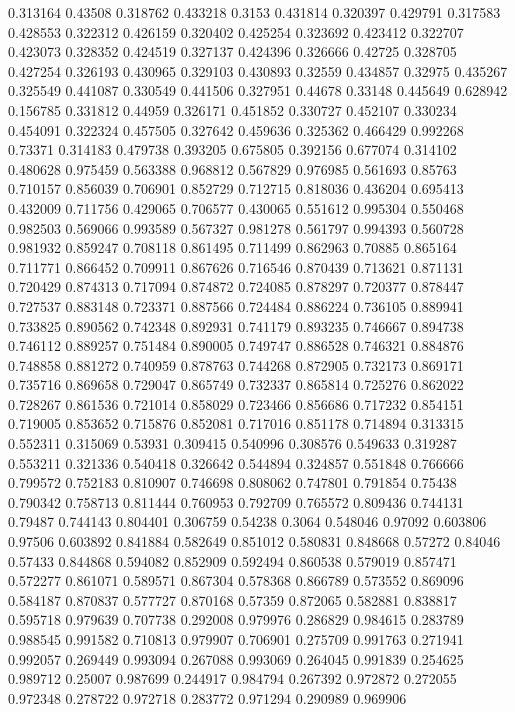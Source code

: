 0.313164 0.43508
0.318762 0.433218
0.3153 0.431814
0.320397 0.429791
0.317583 0.428553
0.322312 0.426159
0.320402 0.425254
0.323692 0.423412
0.322707 0.423073
0.328352 0.424519
0.327137 0.424396
0.326666 0.42725
0.328705 0.427254
0.326193 0.430965
0.329103 0.430893
0.32559 0.434857
0.32975 0.435267
0.325549 0.441087
0.330549 0.441506
0.327951 0.44678
0.33148 0.445649
0.628942 0.156785
0.331812 0.44959
0.326171 0.451852
0.330727 0.452107
0.330234 0.454091
0.322324 0.457505
0.327642 0.459636
0.325362 0.466429
0.992268 0.73371
0.314183 0.479738
0.393205 0.675805
0.392156 0.677074
0.314102 0.480628
0.975459 0.563388
0.968812 0.567829
0.976985 0.561693
0.85763 0.710157
0.856039 0.706901
0.852729 0.712715
0.818036 0.436204
0.695413 0.432009
0.711756 0.429065
0.706577 0.430065
0.551612 0.995304
0.550468 0.982503
0.569066 0.993589
0.567327 0.981278
0.561797 0.994393
0.560728 0.981932
0.859247 0.708118
0.861495 0.711499
0.862963 0.70885
0.865164 0.711771
0.866452 0.709911
0.867626 0.716546
0.870439 0.713621
0.871131 0.720429
0.874313 0.717094
0.874872 0.724085
0.878297 0.720377
0.878447 0.727537
0.883148 0.723371
0.887566 0.724484
0.886224 0.736105
0.889941 0.733825
0.890562 0.742348
0.892931 0.741179
0.893235 0.746667
0.894738 0.746112
0.889257 0.751484
0.890005 0.749747
0.886528 0.746321
0.884876 0.748858
0.881272 0.740959
0.878763 0.744268
0.872905 0.732173
0.869171 0.735716
0.869658 0.729047
0.865749 0.732337
0.865814 0.725276
0.862022 0.728267
0.861536 0.721014
0.858029 0.723466
0.856686 0.717232
0.854151 0.719005
0.853652 0.715876
0.852081 0.717016
0.851178 0.714894
0.313315 0.552311
0.315069 0.53931
0.309415 0.540996
0.308576 0.549633
0.319287 0.553211
0.321336 0.540418
0.326642 0.544894
0.324857 0.551848
0.766666 0.799572
0.752183 0.810907
0.746698 0.808062
0.747801 0.791854
0.75438 0.790342
0.758713 0.811444
0.760953 0.792709
0.765572 0.809436
0.744131 0.79487
0.744143 0.804401
0.306759 0.54238
0.3064 0.548046
0.97092 0.603806
0.97506 0.603892
0.841884 0.582649
0.851012 0.580831
0.848668 0.57272
0.84046 0.57433
0.844868 0.594082
0.852909 0.592494
0.860538 0.579019
0.857471 0.572277
0.861071 0.589571
0.867304 0.578368
0.866789 0.573552
0.869096 0.584187
0.870837 0.577727
0.870168 0.57359
0.872065 0.582881
0.838817 0.595718
0.979639 0.707738
0.292008 0.979976
0.286829 0.984615
0.283789 0.988545
0.991582 0.710813
0.979907 0.706901
0.275709 0.991763
0.271941 0.992057
0.269449 0.993094
0.267088 0.993069
0.264045 0.991839
0.254625 0.989712
0.25007 0.987699
0.244917 0.984794
0.267392 0.972872
0.272055 0.972348
0.278722 0.972718
0.283772 0.971294
0.290989 0.969906
